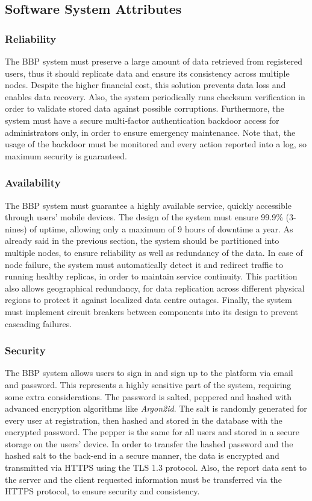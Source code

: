 \subsection{Software System Attributes}
\subsubsection{Reliability}
The BBP system must preserve a large amount of data retrieved from registered users, thus it should replicate data and ensure its consistency across multiple nodes. Despite the higher financial cost, this solution prevents data loss and enables data recovery. Also, the system periodically runs checksum verification in order to validate stored data against possible corruptions. Furthermore, the system must have a secure multi-factor authentication backdoor access for administrators only, in order to ensure emergency maintenance. Note that, the usage of the backdoor must be monitored and every action reported into a log, so maximum security is guaranteed.

\subsubsection{Availability}
The BBP system must guarantee a highly available service, quickly accessible through users' mobile devices. The design of the system must ensure 99.9\% (3-nines) of uptime, allowing only a maximum of 9 hours of downtime a year. As already said in the previous section, the system should be partitioned into multiple nodes, to ensure reliability as well as redundancy of the data. In case of node failure, the system must automatically detect it and redirect traffic to running healthy replicas, in order to maintain service continuity. This partition also allows geographical redundancy, for data replication across different physical regions to protect it against localized data centre outages. Finally, the system must implement circuit breakers between components into its design to prevent cascading failures.

\subsubsection{Security}
The BBP system allows users to sign in and sign up to the platform via email and password. This represents a highly sensitive part of the system, requiring some extra considerations. The password is salted, peppered and hashed with advanced encryption algorithms like \textit{Argon2id}. The salt is randomly generated for every user at registration, then hashed and stored in the database with the encrypted password. The pepper is the same for all users and stored in a secure storage on the users' device. In order to transfer the hashed password and the hashed salt to the back-end in a secure manner, the data is encrypted and transmitted via HTTPS using the TLS 1.3 protocol. Also, the report data sent to the server and the client requested information must be transferred via the HTTPS protocol, to ensure security and consistency.  

